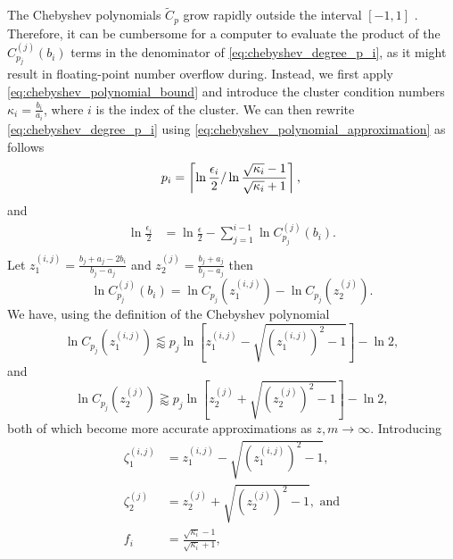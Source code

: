 The Chebyshev polynomials $\tilde{C}_p$ grow rapidly outside the interval $[-1,1]$ \cite[Section 4]{cg_sharpened_convrate_Axelsson1976}. Therefore, it can be cumbersome for a computer to evaluate the product of the $C^{(j)}_{p_j}(b_i)$ terms in the denominator of \cref{eq:chebyshev_degree_p_i}, as it might result in floating-point number overflow during. Instead, we first apply \cref{eq:chebyshev_polynomial_bound} and introduce the cluster condition numbers $\kappa_i = \frac{b_i}{a_i}$, where $i$ is the index of the cluster. We can then rewrite \cref{eq:chebyshev_degree_p_i} using \cref{eq:chebyshev_polynomial_approximation} as follows
\begin{equation*}
    p_i  =  \left\lceil\ln{\frac{\epsilon_i}{2}} / \ln{\frac{\sqrt{\kappa_i} - 1}{\sqrt{\kappa_i} + 1}}\right\rceil, \\
\end{equation*}
and
\begin{align*}
    \ln{\frac{\epsilon_i}{2}} & = \ln{\frac{\epsilon}{2}} - \sum_{j=1}^{i-1} \ln{C^{(j)}_{p_j}(b_i)}. \\
\end{align*}
Let $z^{(i,j)}_1 = \frac{b_j + a_j - 2b_i}{b_j - a_j}$ and $z^{(j)}_2 = \frac{b_j + a_j}{b_j - a_j}$ then
\begin{equation*}
    \ln{C^{(j)}_{p_j}(b_i)} = \ln{C_{p_j}(z^{(i,j)}_1)} - \ln{C_{p_j}(z^{(j)}_2)}.
\end{equation*}
We have, using the definition of the Chebyshev polynomial
\begin{equation}
    \ln{C_{p_j}(z^{(i,j)}_1)} \lessapprox p_j \ln{\left[z^{(i,j)}_1 - \sqrt{\left(z^{(i,j)}_1\right)^2 - 1}\right]} - \ln{2},
    \label{eq:chebyshev_polynomial_bound_z1}
\end{equation}
and
\begin{equation}
    \ln{C_{p_j}(z^{(j)}_2)} \gtrapprox p_j \ln{\left[z^{(j)}_2 + \sqrt{\left(z^{(j)}_2\right)^2 - 1}\right]} - \ln{2},
    \label{eq:chebyshev_polynomial_bound_z2}
\end{equation}
both of which become more accurate approximations as $z,m\rightarrow\infty$. Introducing 
\begin{align*}
    \zeta^{(i,j)}_1 &= z^{(i,j)}_1 - \sqrt{\left(z^{(i,j)}_1\right)^2 - 1}, \\
    \zeta^{(j)}_2 &= z^{(j)}_2 + \sqrt{\left(z^{(j)}_2\right)^2 - 1}, \text{ and}\\
    f_i &= \frac{\sqrt{\kappa_i} - 1}{\sqrt{\kappa_i} + 1},
\end{align*}
